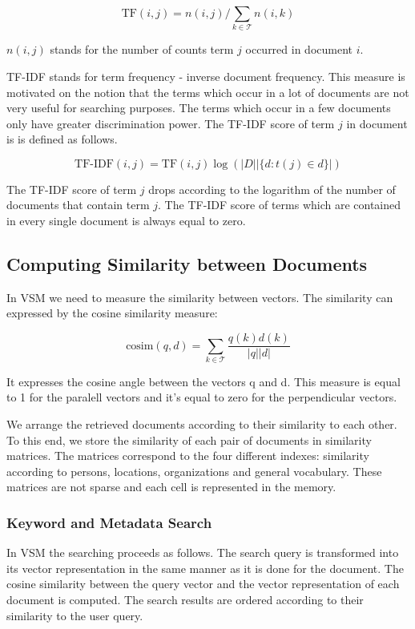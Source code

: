 \[\text{TF}(i,j) = n(i,j) / \sum_{k \in \mathcal{T}}{n(i,k)}\]


$n(i,j)$ stands for the number of counts term $j$ occurred in document $i$.


TF-IDF stands for term frequency - inverse document frequency. This measure is motivated on the notion that the terms which occur in a lot of documents are not very useful for searching purposes. The terms which occur in a few documents only have greater discrimination power. The TF-IDF score of term $j$ in document is is defined as follows.

\[\text{TF-IDF}(i,j) = \text{TF}(i,j)\log{(|D| |\lbrace d : t(j) \in d \rbrace|)}\]

The TF-IDF score of term $j$ drops according to the logarithm of the number of documents that contain term $j$. The TF-IDF score of terms which are contained in every single document is always equal to zero.

\subsection{Computing Similarity between Documents}\label{sec:computing_similarity_between_documents}

In VSM we need to measure the similarity between vectors. The similarity can expressed by the cosine similarity measure:

\[\text{cosim}(q,d) = \sum_{k \in \mathcal{T}}\frac{q(k)d(k)}{|q||d|}\]

It expresses the cosine angle between the vectors q and d. This measure is equal to 1 for the paralell vectors and it's equal to zero for the perpendicular vectors.

We arrange the retrieved documents according to their similarity to each other. To this end, we store the similarity of each pair of documents in similarity matrices. The matrices correspond to the four different indexes: similarity according to persons, locations, organizations and general vocabulary. These matrices are not sparse and each cell is represented in the memory.   





\subsubsection{Keyword and Metadata Search}\label{sec:keyword_search}

In VSM the searching proceeds as follows. The search query is transformed into its vector representation in the same manner as it is done for the document. The cosine similarity between the query vector and the vector representation of each document is computed. The search results are ordered according to their similarity to the user query. 


